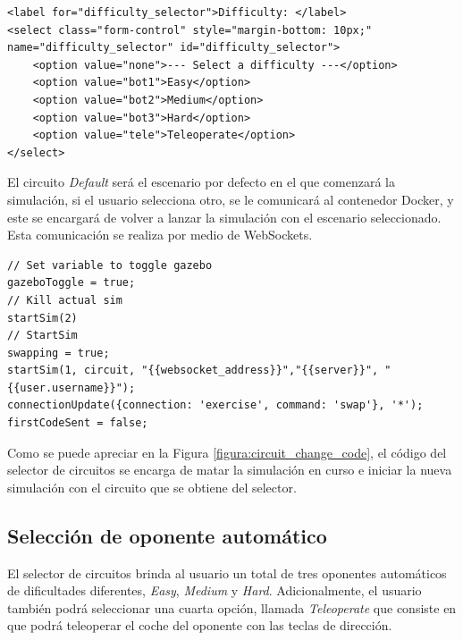 \documentclass[a4paper, 12pt]{book}
\begin{document}
\begin{lstlisting}[basicstyle=\scriptsize\ttfamily]
<label for="difficulty_selector">Difficulty: </label>
<select class="form-control" style="margin-bottom: 10px;" name="difficulty_selector" id="difficulty_selector">
	<option value="none">--- Select a difficulty ---</option>
	<option value="bot1">Easy</option>
	<option value="bot2">Medium</option>
	<option value="bot3">Hard</option>
	<option value="tele">Teleoperate</option>
</select>
\end{lstlisting}


El circuito \emph{Default} será el escenario por defecto en el que comenzará la simulación, si el usuario selecciona otro, se le comunicará al contenedor Docker, y este se encargará de volver a lanzar la simulación con el escenario seleccionado. Esta comunicación se realiza por medio de WebSockets.


\begin{lstlisting}[basicstyle=\ttfamily\scriptsize]
// Set variable to toggle gazebo
gazeboToggle = true;
// Kill actual sim
startSim(2)
// StartSim
swapping = true;
startSim(1, circuit, "{{websocket_address}}","{{server}}", "{{user.username}}");
connectionUpdate({connection: 'exercise', command: 'swap'}, '*');
firstCodeSent = false;
\end{lstlisting}

Como se puede apreciar en la Figura \ref{figura:circuit_change_code}, el código del selector de circuitos se encarga de matar la simulación en curso e iniciar la nueva simulación con el circuito que se obtiene del selector.

\subsection{Selección de oponente automático}
\label{subsec:follow_line_game_difficulty_selector}

El selector de circuitos brinda al usuario un total de tres oponentes automáticos de dificultades diferentes, \emph{Easy}, \emph{Medium} y \emph{Hard}. Adicionalmente, el usuario también podrá seleccionar una cuarta opción, llamada \emph{Teleoperate} que consiste en que podrá teleoperar el coche del oponente con las teclas de dirección.
\end{document}
